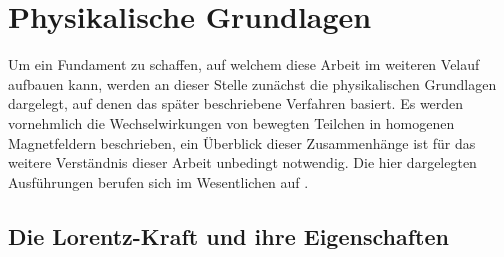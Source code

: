 \chapter{Physikalische Grundlagen}

Um ein Fundament zu schaffen, auf welchem diese Arbeit im weiteren Velauf aufbauen kann, werden
an dieser Stelle zun\"achst die physikalischen Grundlagen dargelegt, auf denen das sp\"ater beschriebene
Verfahren basiert. Es werden vornehmlich die Wechselwirkungen von bewegten Teilchen in homogenen
Magnetfeldern beschrieben, ein \"Uberblick dieser Zusammenh\"ange ist f\"ur das weitere Verst\"andnis
dieser Arbeit unbedingt notwendig. Die hier dargelegten Ausf\"uhrungen berufen sich im Wesentlichen auf \cite{Vog99}.

\section{Die Lorentz-Kraft und ihre Eigenschaften}

